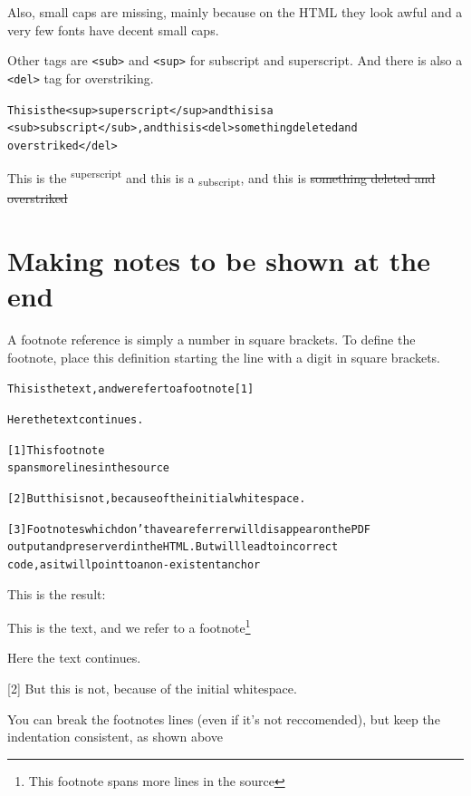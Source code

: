 \documentclass[DIV=12,%
               BCOR=0mm,%
               fontsize=10pt,%
               oneside,%
               paper=210mm:11in]{scrbook}
\newcommand*{\hairline}{%
  \bigskip%
  \noindent \hrulefill%
  \bigskip%
}
\begin{document}
Also, small caps are missing, mainly because on the HTML they look
awful and a very few fonts have decent small caps.


Other tags are \texttt{<sub>} and \texttt{<sup>} for subscript and superscript. And
there is also a \texttt{<del>} tag for overstriking.


\begin{alltt}
This is the <sup>superscript</sup> and this is a
<sub>subscript</sub>, and this is <del>something deleted and
overstriked</del>

\end{alltt}


This is the \textsuperscript{superscript} and this is a
\textsubscript{subscript}, and this is \sout{something deleted and
overstriked}

\section{Making notes to be shown at the end}


A footnote reference is simply a number in square brackets.  To define
the footnote, place this definition starting the line with a digit in
square brackets.


\begin{alltt}
This is the text, and we refer to a footnote [1]

Here the text continues.

[1] This footnote
    spans more lines in the source

 [2] But this is not, because of the initial whitespace.

[3] Footnotes which don't have a referrer will disappear on the PDF
    output and preserverd in the HTML. But will lead to incorrect
    code, as it will point to a non-existent anchor

\end{alltt}


This is the result:


\hairline


This is the text, and we refer to a footnote\footnote{This footnote spans more lines in the source}


Here the text continues.


 [2] But this is not, because of the initial whitespace.


\hairline


You can break the footnotes lines (even if it's not reccomended), but keep the indentation consistent, as shown above
\end{document}
